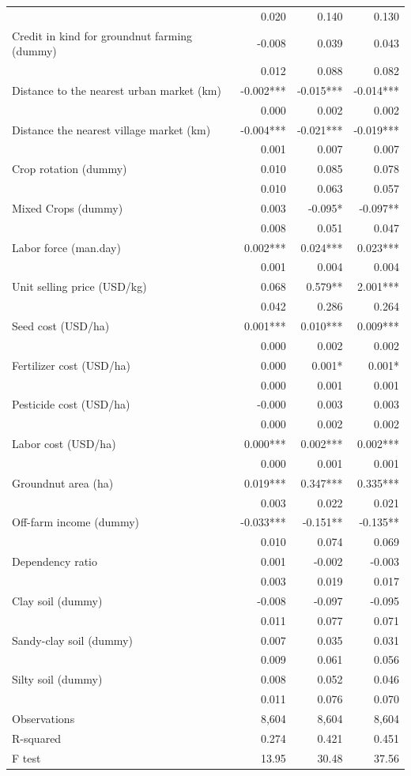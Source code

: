 \documentclass[
]{article}
\begin{document}
\begin{longtable}[t]{lrrr}
 & 0.020 & 0.140 & 0.130\\
Credit in kind for groundnut farming (dummy) & -0.008 & 0.039 & 0.043\\
 & 0.012 & 0.088 & 0.082\\
Distance to the nearest urban market (km) & -0.002*** & -0.015*** & -0.014***\\
 & 0.000 & 0.002 & 0.002\\
Distance the nearest village market (km) & -0.004*** & -0.021*** & -0.019***\\
 & 0.001 & 0.007 & 0.007\\
Crop rotation (dummy) & 0.010 & 0.085 & 0.078\\
 & 0.010 & 0.063 & 0.057\\
Mixed Crops (dummy) & 0.003 & -0.095* & -0.097**\\
 & 0.008 & 0.051 & 0.047\\
Labor force (man.day) & 0.002*** & 0.024*** & 0.023***\\
 & 0.001 & 0.004 & 0.004\\
Unit selling price (USD/kg) & 0.068 & 0.579** & 2.001***\\
 & 0.042 & 0.286 & 0.264\\
Seed cost (USD/ha) & 0.001*** & 0.010*** & 0.009***\\
 & 0.000 & 0.002 & 0.002\\
Fertilizer cost (USD/ha) & 0.000 & 0.001* & 0.001*\\
 & 0.000 & 0.001 & 0.001\\
Pesticide cost (USD/ha) & -0.000 & 0.003 & 0.003\\
 & 0.000 & 0.002 & 0.002\\
Labor cost (USD/ha) & 0.000*** & 0.002*** & 0.002***\\
 & 0.000 & 0.001 & 0.001\\
Groundnut area (ha) & 0.019*** & 0.347*** & 0.335***\\
 & 0.003 & 0.022 & 0.021\\
Off-farm income (dummy) & -0.033*** & -0.151** & -0.135**\\
 & 0.010 & 0.074 & 0.069\\
Dependency ratio & 0.001 & -0.002 & -0.003\\
 & 0.003 & 0.019 & 0.017\\
Clay soil (dummy) & -0.008 & -0.097 & -0.095\\
 & 0.011 & 0.077 & 0.071\\
Sandy-clay soil (dummy) & 0.007 & 0.035 & 0.031\\
 & 0.009 & 0.061 & 0.056\\
Silty soil (dummy) & 0.008 & 0.052 & 0.046\\
 & 0.011 & 0.076 & 0.070\\
Observations & 8,604 & 8,604 & 8,604\\
R-squared & 0.274 & 0.421 & 0.451\\
F test & 13.95 & 30.48 & 37.56\\*
\end{longtable}
\endgroup{}
\newpage
\end{document}
